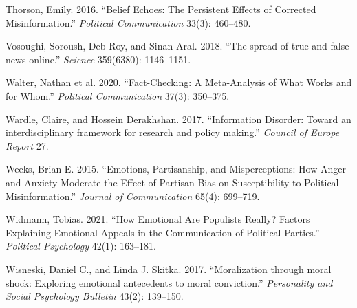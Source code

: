 \documentclass[
  12pt,
]{article}
\begin{document}
\leavevmode\hypertarget{ref-thorson2016belief}{}%
Thorson, Emily. 2016. ``Belief Echoes: The Persistent Effects of Corrected Misinformation.'' \emph{Political Communication} 33(3): 460--480.

\leavevmode\hypertarget{ref-vosoughi2018spread}{}%
Vosoughi, Soroush, Deb Roy, and Sinan Aral. 2018. ``The spread of true and false news online.'' \emph{Science} 359(6380): 1146--1151.

\leavevmode\hypertarget{ref-walter2020fact}{}%
Walter, Nathan et al. 2020. ``Fact-Checking: A Meta-Analysis of What Works and for Whom.'' \emph{Political Communication} 37(3): 350--375.

\leavevmode\hypertarget{ref-wardle2017information}{}%
Wardle, Claire, and Hossein Derakhshan. 2017. ``Information Disorder: Toward an interdisciplinary framework for research and policy making.'' \emph{Council of Europe Report} 27.

\leavevmode\hypertarget{ref-weeks2015emotions}{}%
Weeks, Brian E. 2015. ``Emotions, Partisanship, and Misperceptions: How Anger and Anxiety Moderate the Effect of Partisan Bias on Susceptibility to Political Misinformation.'' \emph{Journal of Communication} 65(4): 699--719.

\leavevmode\hypertarget{ref-widmann2021how}{}%
Widmann, Tobias. 2021. ``How Emotional Are Populists Really? Factors Explaining Emotional Appeals in the Communication of Political Parties.'' \emph{Political Psychology} 42(1): 163--181.

\leavevmode\hypertarget{ref-wisneski2017moralization}{}%
Wisneski, Daniel C., and Linda J. Skitka. 2017. ``Moralization through moral shock: Exploring emotional antecedents to moral conviction.'' \emph{Personality and Social Psychology Bulletin} 43(2): 139--150.
\end{document}
